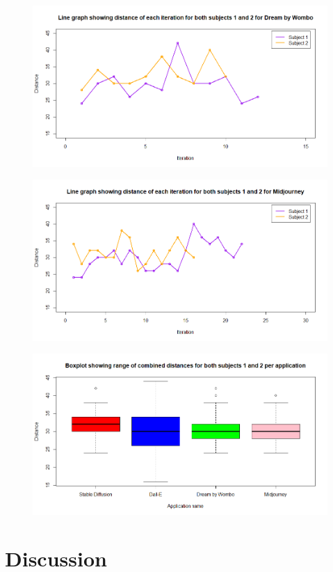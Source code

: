 \documentclass[]{report}
\begin{document}
	
	
	\begin{figure}
		\centering
		\includegraphics[width=1\linewidth]{LineGraphDBW}
		\caption{}
		\label{fig:linegraphdbw}
	\end{figure}
	
	
	\begin{figure}
		\centering
		\includegraphics[width=1\linewidth]{LineGraphMidJ}
		\caption{}
		\label{fig:linegraphmidj}
	\end{figure}
	
	\begin{figure}
		\centering
		\includegraphics[width=1\linewidth]{boxplotWithAllData}
		\caption{}
		\label{fig:boxplotwithalldata}
	\end{figure}
	
	
	\section{Discussion}
	
\end{document}
